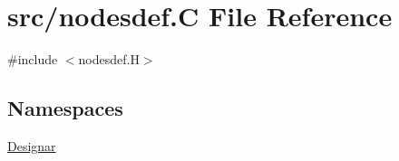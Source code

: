 \hypertarget{nodesdef_8_c}{}\section{src/nodesdef.C File Reference}
\label{nodesdef_8_c}
{\ttfamily \#include $<$nodesdef.\+H$>$}\newline
\subsection*{Namespaces}
\begin{DoxyCompactItemize}
\item 
 \hyperlink{namespace_designar}{Designar}
\end{DoxyCompactItemize}
